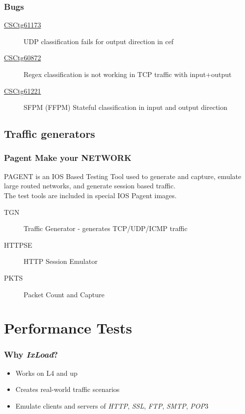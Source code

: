 \documentclass{beamer}
\newcommand{\ixload}{\emph{IxLoad}}
\newcommand{\http}{\emph{HTTP}}
\newcommand{\ftp}{\emph{FTP}}
\newcommand{\ssl}{\emph{SSL}}
\newcommand{\pop}{\emph{POP$3$}}
\newcommand{\smtp}{\emph{SMTP}}
\begin{document}
\begin{frame}[fragile] \frametitle{Bugs}
\begin{description}
    \item[\href{http://cdets.cisco.com/apps/dumpcr?identifier=CSCtg61173\&content=summary\&format=html}{CSCtg61173}] UDP classification fails for output direction in cef
    \item[\href{http://cdets.cisco.com/apps/dumpcr?identifier=CSCtg60872\&content=summary\&format=html}{CSCtg60872}] Regex classification is not working in TCP traffic with input+output
    \item[\href{http://cdets.cisco.com/apps/dumpcr?identifier=CSCtg61221\&content=summary\&format=html}{CSCtg61221}] SFPM (FFPM) Stateful classification in input and output direction
\end{description}
\end{frame}

\subsection{Traffic generators}
\begin{frame}[fragile] \frametitle{Pagent Make your NET{\color{red}WORK}}
PAGENT is an IOS Based Testing Tool used to generate and capture, emulate large routed networks, and generate session based traffic.\\
The test tools are included in special IOS Pagent images.
\begin{block}{}
\begin{description}
    \item[TGN] Traffic Generator - generates TCP/UDP/ICMP traffic
    \item[HTTPSE] HTTP Session Emulator
    \item[PKTS] Packet Count and Capture
\end{description}
\end{block}
\end{frame}

\section{Performance Tests}
\begin{frame}[fragile] \frametitle{Why \ixload?}
\begin{block}{}
\begin{itemize}
	\item Works on L4 and up
	\item Creates real-world traffic scenarios
	\item Emulate clients and servers of \http, \ssl, \ftp, \smtp, \pop
\end{itemize}
\end{block}
\end{frame}
\end{document}
